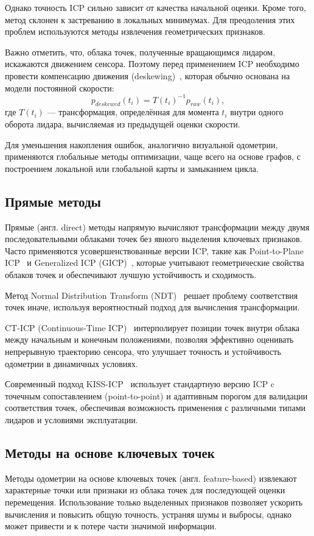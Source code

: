 Однако точность ICP сильно зависит от качества начальной 
оценки. Кроме того, метод склонен к застреванию в локальных минимумах. Для преодоления 
этих проблем используются методы извлечения геометрических признаков.

Важно отметить, что, облака точек, полученные вращающимся лидаром, искажаются движением сенсора. 
Поэтому перед применением ICP необходимо провести компенсацию движения (deskewing)~\cite{he2020skewing}, 
которая обычно основана на модели постоянной скорости:
\begin{equation*}
    p_{deskewed}(t_i) = T(t_i)^{-1} p_{raw}(t_i),
\end{equation*}
где $T(t_i)$ --- трансформация, определённая для момента $t_i$ внутри одного оборота 
лидара, вычисляемая из предыдущей оценки скорости.

Для уменьшения накопления ошибок, аналогично визуальной одометрии, применяются
глобальные методы оптимизации, чаще всего на основе графов, с построением 
локальной или глобальной карты и замыканием цикла.

\subsection{Прямые методы}
Прямые (англ. direct) методы напрямую вычисляют трансформации между двумя последовательными 
облаками точек без явного выделения ключевых признаков. Часто применяются усовершенствованные версии 
ICP, такие как Point-to-Plane ICP~\cite{low2004linear} и Generalized ICP (GICP)~\cite{segal2009generalized}, которые учитывают 
геометрические свойства облаков точек и обеспечивают лучшую устойчивость 
и сходимость.

Метод Normal Distribution Transform (NDT)~\cite{zhou2021ndt} решает проблему соответствия точек 
иначе, используя вероятностный подход для вычисления 
трансформации. 

CT-ICP (Continuous-Time ICP)~\cite{dellenbach2022ct} интерполирует позиции точек внутри облака между 
начальным и конечным положениями, позволяя эффективно оценивать непрерывную 
траекторию сенсора, что улучшает точность и устойчивость одометрии в динамичных 
условиях.

Современный подход KISS-ICP~\cite{vizzo2023kiss} использует стандартную версию ICP c точечным сопоставлением 
(point-to-point) и адаптивным порогом для валидации соответствия точек, обеспечивая 
возможность применения с различными типами лидаров и условиями эксплуатации.


\subsection{Методы на основе ключевых точек}
Методы одометрии на основе ключевых точек (англ. feature-based) извлекают характерные точки или 
признаки из облака точек для последующей оценки 
перемещения. Использование только выделенных признаков позволяет ускорить 
вычисления и повысить общую точность, устраняя шумы и выбросы, однако может привести
и к потере части значимой информации.

